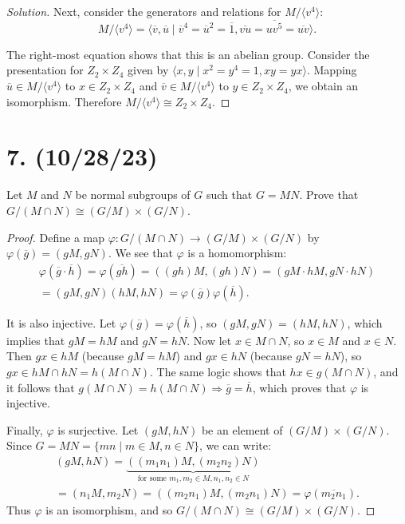 \documentclass{article}
\begin{document}
\begin{proof}[Solution]
    Next, consider the generators and relations for $M/\langle v^4 \rangle$:
    \begin{equation*}
        M/\langle v^4 \rangle = \langle \overline{v}, \overline{u} \mid \overline{v}^4 = \overline{u}^2 = \overline{1}, \overline{v u} = \overline{u v^5} = \overline{uv} \rangle.
    \end{equation*}

    The right-most equation shows that this is an abelian group. Consider the presentation for $Z_2 \times Z_4$ given by $\langle x, y \mid x^2 = y^4 = 1, xy = yx \rangle$. Mapping $\overline{u} \in M/\langle v^4 \rangle$ to $x \in Z_2 \times Z_4$ and $\overline{v} \in M/\langle v^4 \rangle$ to $y \in Z_2 \times Z_4$, we obtain an isomorphism. Therefore $M/\langle v^4 \rangle \cong Z_2 \times Z_4$.
\end{proof}

\section*{7. (10/28/23)}

Let $M$ and $N$ be normal subgroups of $G$ such that $G = MN$. Prove that $G/(M \cap N) \cong (G/M) \times (G/N)$.

\begin{proof}
    Define a map $\varphi: G/(M \cap N) \rightarrow (G/M) \times (G/N)$ by $\varphi(\overline{g}) = (gM, gN)$. We see that $\varphi$ is a homomorphism:
    \begin{multline*}
        \varphi(\overline{g} \cdot \overline{h}) = \varphi(\overline{gh}) = ((gh)M, (gh)N) = (gM \cdot hM, gN \cdot hN) \\ = (gM, gN)(hM, hN) = \varphi(\overline{g})\varphi(\overline{h}).
    \end{multline*}

    It is also injective. Let $\varphi(\overline{g}) = \varphi(\overline{h})$, so $(gM, gN) = (hM, hN)$, which implies that $gM = hM$ and $gN = hN$. Now let $x \in M \cap N$, so $x \in M$ and $x \in N$. Then $gx \in hM$ (because $gM = hM$) and $gx \in hN$ (because $gN = hN$), so $gx \in hM \cap hN = h(M \cap N)$. The same logic shows that $hx \in g(M \cap N)$, and it follows that $g(M \cap N) = h(M \cap N) \Rightarrow \overline{g} = \overline{h}$, which proves that $\varphi$ is injective.

    Finally, $\varphi$ is surjective. Let $(gM, hN)$ be an element of $(G/M) \times (G/N)$. Since $G = MN = \{ mn \mid m \in M, n \in N \}$, we can write:
    \begin{multline*}
        (gM, hN) = \underbrace{((m_1 n_1)M, (m_2 n_2)N)}_{\text{for some $m_1, m_2 \in M, n_1, n_2 \in N$}} \\ = (n_1 M, m_2 N) = ((m_2 n_1) M, (m_2 n_1) N) = \varphi(\overline{m_2 n_1}).
    \end{multline*}
    Thus $\varphi$ is an isomorphism, and so $G/(M \cap N) \cong (G/M) \times (G/N)$.
\end{proof}
\end{document}
